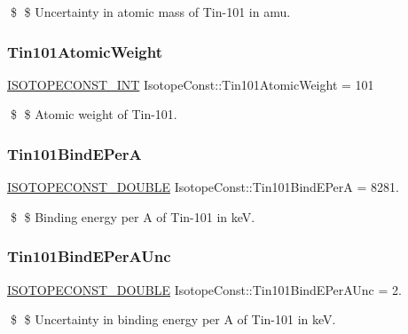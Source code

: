 \$ \$ Uncertainty in atomic mass of Tin-\/101 in amu. \mbox{\label{group___isotope_const-_tin-_sn101_gad6178b1298130a6475e1e7071db2f641}} 
\subsubsection{\texorpdfstring{Tin101\+Atomic\+Weight}{Tin101AtomicWeight}}
{\footnotesize\ttfamily \mbox{\hyperlink{group___isotope_const-_macros_ga5f18360b3e99483a35c32d789e62621c}{I\+S\+O\+T\+O\+P\+E\+C\+O\+N\+S\+T\+\_\+\+I\+NT}} Isotope\+Const\+::\+Tin101\+Atomic\+Weight = 101}

\$ \$ Atomic weight of Tin-\/101. \mbox{\label{group___isotope_const-_tin-_sn101_ga16e8610873db833802546c284e14d30c}} 
\subsubsection{\texorpdfstring{Tin101\+Bind\+E\+PerA}{Tin101BindEPerA}}
{\footnotesize\ttfamily \mbox{\hyperlink{group___isotope_const-_macros_ga8f45a7272ce02c0b4c65c44636ed719a}{I\+S\+O\+T\+O\+P\+E\+C\+O\+N\+S\+T\+\_\+\+D\+O\+U\+B\+LE}} Isotope\+Const\+::\+Tin101\+Bind\+E\+PerA = 8281.}

\$ \$ Binding energy per A of Tin-\/101 in keV. \mbox{\label{group___isotope_const-_tin-_sn101_gaddeceb21889f310b43cc8c44f9d3890a}} 
\subsubsection{\texorpdfstring{Tin101\+Bind\+E\+Per\+A\+Unc}{Tin101BindEPerAUnc}}
{\footnotesize\ttfamily \mbox{\hyperlink{group___isotope_const-_macros_ga8f45a7272ce02c0b4c65c44636ed719a}{I\+S\+O\+T\+O\+P\+E\+C\+O\+N\+S\+T\+\_\+\+D\+O\+U\+B\+LE}} Isotope\+Const\+::\+Tin101\+Bind\+E\+Per\+A\+Unc = 2.}

\$ \$ Uncertainty in binding energy per A of Tin-\/101 in keV. \mbox{\label{group___isotope_const-_tin-_sn101_ga697b26f2019996d0b6cfe18b393a654e}} 
